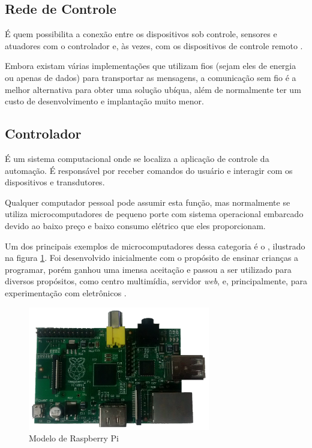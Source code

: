 \subsection{Rede de Controle}
É quem possibilita a conexão entre os dispositivos sob controle, sensores e atuadores com o controlador e, às
vezes, com os dispositivos de controle remoto \cite{kyas2013}.

Embora existam várias implementações que utilizam fios (sejam eles de energia ou apenas de dados) para
transportar as mensagens, a comunicação sem fio é a melhor alternativa para obter uma solução ubíqua, além de
normalmente ter um custo de desenvolvimento e implantação muito menor.

\subsection{Controlador}
É um sistema computacional onde se localiza a aplicação de controle da automação. É responsável por receber comandos do
usuário e interagir com os dispositivos e transdutores.

Qualquer computador pessoal pode assumir esta função, mas normalmente se utiliza microcomputadores de pequeno porte com sistema
operacional embarcado devido ao baixo preço e baixo consumo elétrico que eles proporcionam.

Um dos principais exemplos de microcomputadores dessa categoria é o , ilustrado na figura
\ref{figura:pi}. Foi desenvolvido inicialmente com o propósito de ensinar crianças a programar, porém ganhou uma
imensa aceitação e passou a ser utilizado para diversos propósitos, como centro multimídia, servidor
\textit{web}, e, principalmente, para experimentação com eletrônicos \cite{schmidt2014}.

\begin{figure}[h]
	\centering
	\includegraphics[width=300]{../images/raspberry.png}
	\caption{Modelo de Raspberry Pi}
	\label{figura:pi}
\end{figure}

